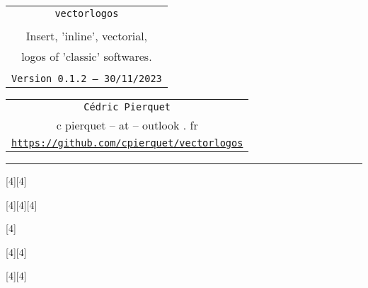 \documentclass[11pt,a4paper]{ltxdoc}
\def\TPversion{0.1.2}
\def\TPdate{30/11/2023}
\begin{document}
\pagestyle{fancy}

\thispagestyle{empty}

\begin{center}
	\begin{minipage}{0.88\linewidth}
	\begin{tcolorbox}[colframe=yellow,colback=yellow!15]
		\begin{center}
			\begin{tabular}{c}
				{\Huge \texttt{vectorlogos}}\\
				\\
				{\LARGE Insert, 'inline', vectorial,} \\
				{\LARGE logos of 'classic' softwares.} \\
				\\
				{\small \texttt{Version \TPversion{} -- \TPdate}}
		\end{tabular}
		\end{center}
	\end{tcolorbox}
\end{minipage}
\end{center}

\begin{center}
	\begin{tabular}{c}
	\texttt{Cédric Pierquet}\\
	{\ttfamily c pierquet -- at -- outlook . fr}\\
	\texttt{\url{https://github.com/cpierquet/vectorlogos}} \\
\end{tabular}
\end{center}

\hrule

\vfill

\begin{tcolorbox}[colframe=lightgray,colback=lightgray!5]
\begin{center}
\scalebox{4}[4]{\logogeogebra}\hspace{1cm}\scalebox{4}[4]{\logogeogebra[icon]}

\medskip

\scalebox{4}[4]{\logoscratch}\hspace{1cm}\scalebox{4}[4]{\logoscratch[alt]}\hspace{1cm}\scalebox{4}[4]{\logoscratch[cat]}

\medskip

\scalebox{4}[4]{\logotexstudio}

\medskip

\scalebox{4}[4]{\logoemacs}\hspace{1cm}\scalebox{4}[4]{\logoemacs[alt]}

\medskip

\scalebox{4}[4]{\logotexmaker}\hspace{1cm}\scalebox{4}[4]{\logotexmaker[alt]}
\end{center}
\end{tcolorbox}
\end{document}
